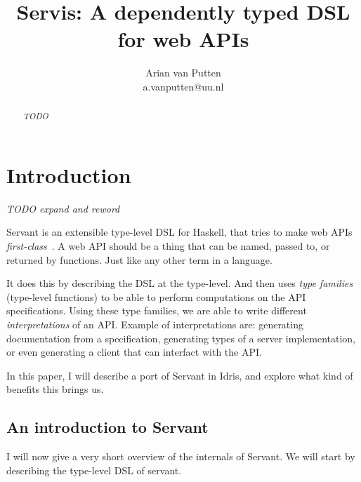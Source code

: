 \documentclass[12pt,a4paper]{article}
\author{Arian van Putten \\ a.vanputten@uu.nl}
\title{Servis: A dependently typed DSL for web APIs}
\begin{document}
\maketitle
\begin{abstract}
\emph{TODO}



\end{abstract}

\section{Introduction}
\emph{TODO expand and reword}

Servant is an extensible type-level DSL for Haskell, that tries to make web APIs \emph{first-class}~\cite{servant}. A web API should be a thing that can be named, passed to, or returned by functions. Just like any other term in a language.

It does this by describing the DSL at the type-level. And then uses \emph{type families} (type-level functions) to be able to perform computations on the API specifications.  Using these type families, we are able to write different \emph{interpretations} of an API\@.  Example of interpretations are: generating documentation from a specification, generating types of a server implementation, or even generating a client that can interfact with the API\@.

In this paper, I will describe a port of Servant in Idris, and explore what kind of benefits this brings us.

\subsection{An introduction to Servant}
I will now give a very short overview of the internals of Servant. We will start by describing the type-level DSL of servant. 
\end{document}
